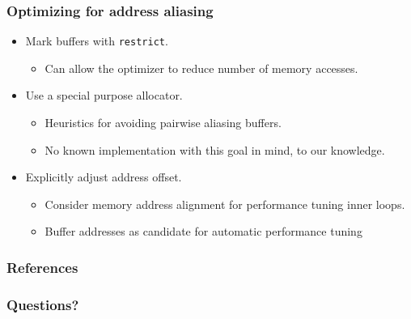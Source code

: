 \documentclass{beamer}
\begin{document}
\begin{frame}
\frametitle{Optimizing for address aliasing}


\begin{itemize}
  \item Mark buffers with \texttt{restrict}.
  \begin{itemize}
    \item Can allow the optimizer to reduce number of memory accesses.
  \end{itemize}
  \item Use a special purpose allocator.
  \begin{itemize}
    \item Heuristics for avoiding pairwise aliasing buffers.
    \item No known implementation with this goal in mind, to our knowledge.
  \end{itemize}
  \item Explicitly adjust address offset.
  \begin{itemize}
    \item Consider memory address alignment for performance tuning inner loops.
    \item Buffer addresses as candidate for automatic performance tuning
  \end{itemize}
\end{itemize}

\end{frame}


\begin{frame}

\frametitle{References}

\scriptsize{}


\end{frame}

\begin{frame}
  \frametitle{Questions?}
\end{frame}
\end{document}
